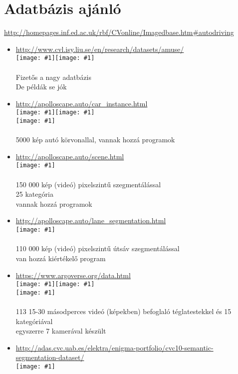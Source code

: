 \documentclass[12pt]{report}
\newcommand{\img}[1]{\texttt{[image: \#1]}}
\begin{document}
\section{Adatbázis ajánló}
\url{http://homepages.inf.ed.ac.uk/rbf/CVonline/Imagedbase.htm#autodriving}
\begin{itemize}
	\item \url{http://www.cvl.isy.liu.se/en/research/datasets/amuse/}
	\\	\img{1}\img{2}
	\\
	\\Fizetős a nagy adatbázis
	\\De példák se jók
	\item \url{http://apolloscape.auto/car_instance.html}
	\\	\img{3}\img{4}
	\\\img{5}
	\\
	\\5000 kép autó körvonallal, vannak hozzá programok
	\item \url{http://apolloscape.auto/scene.html}
	\\\img{6}
	\\
	\\150 000 kép (videó) pixelszintű szegmentálással
	\\25 kategória
	\\vannak hozzá programok
	\item \url{http://apolloscape.auto/lane_segmentation.html}
	\\\img{7}
	\\
	\\110 000 kép (videó) pixelszintű útsáv szegmentálással
	\\van hozzá kiértékelő program
	\item \url{https://www.argoverse.org/data.html}
	\\\img{8}\img{9}
	\\\img{10}
	\\
	\\113 15-30 másodperces videó (képekben) befoglaló téglatestekkel és 15 kategóriával
	\\egyszerre 7 kamerával készült
	\item \url{http://adas.cvc.uab.es/elektra/enigma-portfolio/cvc10-semantic-segmentation-dataset/}
	\\\img{11}
	\\

\end{itemize}
\end{document}
